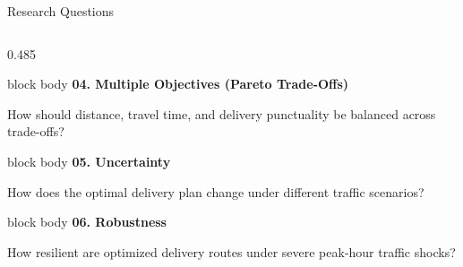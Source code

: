 \documentclass[aspectratio=169,10pt]{beamer}
\begin{document}
\begin{frame}{Research Questions}
\begin{columns}[T,totalwidth=\textwidth]
\begin{column}{0.485\textwidth}
        \begin{beamercolorbox}[rounded=true,shadow=false,wd=\linewidth,sep=3.5pt]{block body}
            {\bfseries\color{Primary}\scriptsize 04. Multiple Objectives (Pareto Trade-Offs)}\par\vspace{0.02cm}
            \footnotesize How should distance, travel time, and delivery punctuality be balanced across trade-offs?
        \end{beamercolorbox}

        \vspace{0.15cm}

        \begin{beamercolorbox}[rounded=true,shadow=false,wd=\linewidth,sep=3.5pt]{block body}
            {\bfseries\color{Primary}\scriptsize 05. Uncertainty}\par\vspace{0.02cm}
            \footnotesize How does the optimal delivery plan change under different traffic scenarios?
        \end{beamercolorbox}

        \vspace{0.15cm}

        \begin{beamercolorbox}[rounded=true,shadow=false,wd=\linewidth,sep=3.5pt]{block body}
            {\bfseries\color{Primary}\scriptsize 06. Robustness}\par\vspace{0.02cm}
            \footnotesize How resilient are optimized delivery routes under severe peak-hour traffic shocks?
        \end{beamercolorbox}

    \end{column}

\end{columns}

\vfill
\end{frame}

\end{document}
